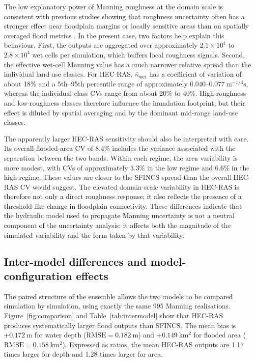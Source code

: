 \documentclass[a4paper,fleqn]{cas-sc}
\newcommand{\sfincs}{\textsc{SFINCS}}
\newcommand{\hecras}{\textsc{HEC-RAS}}
\begin{document}
The low explanatory power of Manning roughness at the domain scale is consistent with previous studies showing that roughness uncertainty often has a stronger effect near floodplain margins or locally sensitive areas than on spatially averaged flood metrics \citep{aronica2002,hall2005,fewtrell2011, savage2016}. In the present case, two factors help explain this behaviour. First, the outputs are aggregated over approximately $2.1\times10^4$ to $2.8\times10^4$ wet cells per simulation, which buffers local roughness
signals. Second, the effective wet-cell Manning value has a much narrower relative spread than the individual land-use classes. For \hecras{}, $\bar{n}_{\mathrm{wet}}$ has a coefficient of variation of about 18\% and a 5th--95th percentile range of approximately $0.040$--$0.077~\mathrm{m^{-1/3}s}$, whereas the individual class CVs range from about 20\% to 40\%. High-roughness and low-roughness classes therefore influence the inundation footprint, but their effect is diluted by spatial averaging and by the dominant mid-range land-use classes.

The apparently larger \hecras{} sensitivity should also be interpreted with care. Its overall flooded-area CV of 8.4\% includes the variance associated with the separation between the two bands. Within each regime, the area variability is more modest, with CVs of approximately 3.3\% in the low regime and 6.6\% in the high regime. These values are closer to the \sfincs{} spread than the overall \hecras{} CV would suggest. The elevated domain-scale variability in \hecras{} is therefore not only a direct roughness response; it also reflects the presence of a threshold-like change in floodplain connectivity. These differences indicate that the hydraulic model used to propagate Manning
uncertainty is not a neutral component of the uncertainty analysis: it affects both the magnitude of the simulated variability and the form taken by that variability.

\subsection{Inter-model differences and model-configuration effects}\label{sec:res_intermodel}
The paired structure of the ensemble allows the two models to be compared simulation by simulation, using exactly the same \num{995} Manning realisations. Figure~\ref{fig:comparison} and Table~\ref{tab:intermodel} show that \hecras{} produces systematically larger flood outputs than \sfincs{}. The mean bias is $+0.172~\mathrm{m}$ for water depth ($\mathrm{RMSE}=0.182~\mathrm{m}$) and $+0.149~\mathrm{km^2}$ for flooded area ($\mathrm{RMSE}=0.158~\mathrm{km^2}$). Expressed as ratios, the mean \hecras{} outputs are 1.17 times larger for depth and 1.28 times larger for area.
\end{document}
